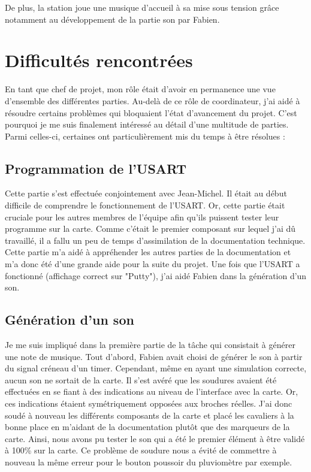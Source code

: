 \documentclass[a4paper]{report}
\begin{document}
De plus, la station joue une musique d'accueil à sa mise sous tension grâce notamment au développement de la partie son par Fabien.

\section{Difficultés rencontrées}
En tant que chef de projet, mon rôle était d'avoir en permanence une vue d'ensemble des différentes parties.
Au-delà de ce rôle de coordinateur, j'ai aidé à résoudre certains problèmes qui bloquaient l'état d'avancement du projet.
C'est pourquoi je me suis finalement intéressé au détail d'une multitude de parties.
Parmi celles-ci, certaines ont particulièrement mis du temps à être résolues :
\subsection{Programmation de l'USART}
Cette partie s'est effectuée conjointement avec Jean-Michel.
Il était au début difficile de comprendre le fonctionnement de l'USART.
Or, cette partie était cruciale pour les autres membres de l'équipe afin qu'ils puissent tester leur programme sur la carte.
Comme c'était le premier composant sur lequel j'ai dû travaillé, il a fallu un peu de temps d'assimilation de la documentation technique.
Cette partie m'a aidé à appréhender les autres parties de la documentation et m'a donc été d'une grande aide pour la suite du projet.
Une fois que l'USART a fonctionné (affichage correct sur "Putty"), j'ai aidé Fabien dans la génération d'un son.
\subsection{Génération d'un son}
Je me suis impliqué dans la première partie de la tâche qui consistait à générer une note de musique.
Tout d'abord, Fabien avait choisi de générer le son à partir du signal créneau d'un timer.
Cependant, même en ayant une simulation correcte, aucun son ne sortait de la carte.
Il s'est avéré que les soudures avaient été effectuées en se fiant à des indications au niveau de l'interface avec la carte.
Or, ces indications étaient symétriquement opposées aux broches réelles. J'ai donc soudé à nouveau les différents composants de la carte et placé les cavaliers à la bonne place en m'aidant de la documentation plutôt que des marqueurs de la carte.
Ainsi, nous avons pu tester le son qui a été le premier élément à être validé à 100\% sur la carte.
Ce problème de soudure nous a évité de commettre à nouveau la même erreur pour le bouton poussoir du pluviomètre par exemple.
\end{document}
